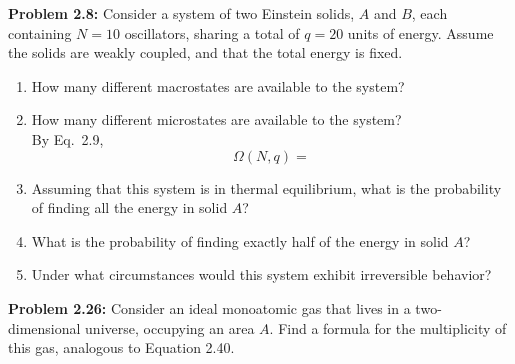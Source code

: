 \documentclass[a4paper, 12pt]{config/homework}
\begin{document}
\pagebreak\noindent
\textbf{Problem 2.8:} Consider a system of two Einstein solids, \(A\) and \(B\), each containing \(N=10\) oscillators, sharing a total of \(q=20\) units of energy. Assume the solids are weakly coupled, and that the total energy is fixed.
\begin{enumerate}[label=\textbf{(\alph*)}]
\item How many different macrostates are available to the system?\\
\bigskip\noindent

\item How many different microstates are available to the system?\\
\bigskip\noindent
By Eq.\ 2.9,
\[\Omega(N,q)=\]


\item Assuming that this system is in thermal equilibrium, what is the probability of finding all the energy in solid \(A\)?\\
\bigskip\noindent


\item What is the probability of finding exactly half of the energy in solid \(A\)?\\
\bigskip\noindent


\item Under what circumstances would this system exhibit irreversible behavior? \\
\bigskip\noindent


\end{enumerate}
\pagebreak\noindent
\textbf{Problem 2.26:} Consider an ideal monoatomic gas that lives in a two-dimensional universe, occupying an area \(A\). Find a formula for the multiplicity of this gas, analogous to Equation 2.40.
\bigskip\noindent\\
\end{document}
